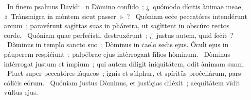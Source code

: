{~In finem psalmus Davídi}
{%
~n Dòmino confído~; ¿~quómodo dícitis ànimae meae, «~Trànsmigra in mòntem sicut passer~»~?
~Quóniam ecċe peccatóres intendérunt arcum~; paravérunt saġìttas suas in pháretra, ut saġìttent in obscúro rectos corde.
~Quóniam quae perfeċìsti, destruxérunt~; ¿~justus autem, quid feċit~?
~Dòminus in templo sancto suo~; Dòminus in ċaelo sedis ejus. Òculi ejus in páuperem respìċiunt~; palpébrae ejus intèrrogant fílios hòminum.
~Dòminus intèrrogat justum et ìmpium~; qui autem díligit iniquitátem, odit ànimam suam.
~Pluet super peccatóres làqueos~; ìgnis et sùlphur, et spíritüs proċellárum, pars cáliċis eórum.
~Quóniam justus Dòminus, et justìçias diléxit~; aequitátem vïdit vùltus ejus.}
